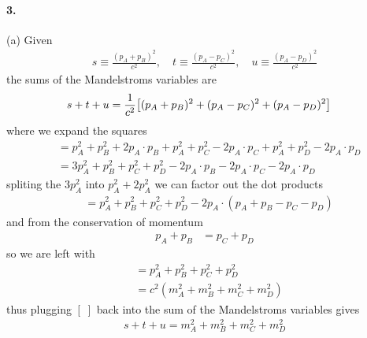 \documentclass[../main.tex]{subfiles}
\begin{document}
\paragraph{3.} (a) Given
\begin{align*}
    s \equiv \frac{(p_A + p_B)^2}{c^2}, \quad t \equiv \frac{(p_A - p_C)^2}{c^2},
    \quad u \equiv \frac{(p_A - p_D)^2}{c^2}
\end{align*}
the sums of the Mandelstroms variables are
\begin{align*}
    s + t + u &= \frac{1}{c^2} \qt[(p_A + p_B)^2 + (p_A - p_C)^2 + (p_A - p_D)^2]
\end{align*}
where we expand the squares
\begin{align*}
    [\;] &= p_A^2 + p_B^2 + 2p_A \cdot p_B + p_A^2 + p_C^2 - 2p_A \cdot p_C 
        + p_A^2 + p_D^2 - 2p_A \cdot p_D \\
    &= 3p_A^2 + p_B^2 + p_C^2 + p_D^2 - 2p_A \cdot p_B - 2p_A \cdot p_C - 2p_A \cdot p_D
\end{align*}
spliting the $3p_A^2$ into $p_A^2 + 2p_A^2$ we can factor out the dot products
\begin{align*}
    [\;] &= p_A^2 + p_B^2 + p_C^2 + p_D^2 - 2 p_A \cdot (p_A + p_B - p_C - p_D)
\end{align*}
and from the conservation of momentum 
\begin{align*}
    p_A + p_B &= p_C + p_D
\end{align*}
so we are left with 
\begin{align*}
    [\;] &= p_A^2 + p_B^2 + p_C^2 + p_D^2 \\
    &= c^2 (m_A^2 + m_B^2 + m_C^2 + m_D^2)
\end{align*}
thus plugging $[\;]$ back into the sum of the Mandelstroms variables gives
\begin{align*}
    s + t + u = m_A^2 + m_B^2 + m_C^2 + m_D^2
\end{align*}
\end{document}
